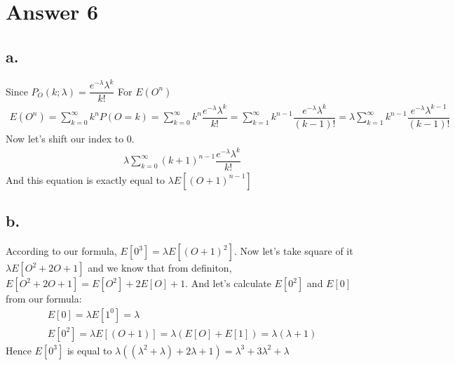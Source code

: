 \documentclass[12pt]{article}
\begin{document}
\section*{Answer 6}

\subsection*{a.}

Since $P_O(k;\lambda) = \dfrac{e^{-\lambda} \lambda^k}{k!} $ For $E(O^n)$
\begin{equation} 
\begin{split}
E(O^n) = \sum_{k=0}^{\infty}k^nP(O=k) = \sum_{k=0}^{\infty}k^n\dfrac{e^{-\lambda} \lambda^k}{k!}= \sum_{k=1}^{\infty}k^{n-1}\dfrac{e^{-\lambda} \lambda^k}{(k-1)!} = \lambda \sum_{k=1}^{\infty}k^{n-1}\dfrac{e^{-\lambda} \lambda^{k-1}}{(k-1)!}
\end{split}
\end{equation}
Now let's shift our index to 0.
\begin{equation} 
\begin{split}
\lambda \sum_{k=0}^{\infty}(k+1)^{n-1}\dfrac{e^{-\lambda} \lambda^{k}}{k!}
\end{split}
\end{equation}
And this equation is exactly equal to $\lambda E[(O+1)^{n-1}]$
\subsection*{b.}
According to our formula, $E[0^3] = \lambda E[(O+1)^2]$. Now let's take square of it $\lambda E[O^2+2O+1]$ and we know that from definiton, $E[O^2+2O+1] = E[O^2]+2E[O]+1$. And let's calculate $E[0^2]$ and $E[0]$ from our formula:
\begin{equation} 
\begin{split}
E[0] = \lambda E[1^0] = \lambda \\
E[0^2] = \lambda E[(O+1)] = \lambda (E[O] + E[1]) = \lambda ( \lambda +1) 
\end{split}
\end{equation}
Hence $E[0^3]$ is equal to $\lambda((\lambda ^2 +\lambda)+2\lambda +1 ) = \lambda ^3 + 3\lambda ^2 +\lambda $
\end{document}
